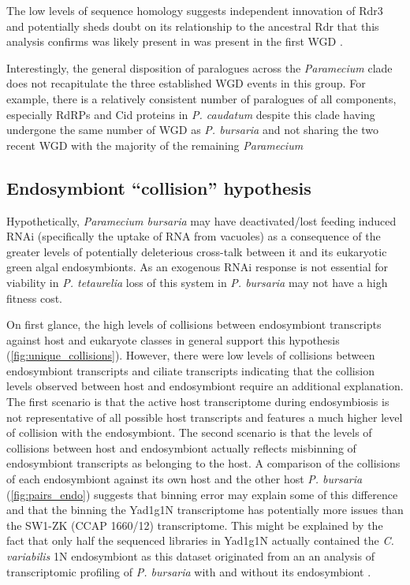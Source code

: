 The low levels of sequence homology suggests independent innovation 
of Rdr3 and potentially sheds doubt on its relationship to the ancestral
Rdr that this analysis confirms was likely present in 
was present in the first WGD \citep{Marker2014}.


Interestingly, the general disposition of paralogues across the \textit{Paramecium}
clade does not recapitulate the three established WGD events in this group.
For example, there is a relatively consistent number of paralogues of 
all components, especially RdRPs and Cid proteins in \textit{P. caudatum} 
despite this clade having undergone the same number of WGD as \textit{P. bursaria}
and not sharing the two recent WGD with the majority of the remaining \textit{Paramecium} 


\subsection{Endosymbiont ``collision'' hypothesis}

Hypothetically, \textit{Paramecium bursaria}
may have deactivated/lost feeding induced RNAi (specifically the
uptake of RNA from vacuoles) as a consequence
of the greater levels of potentially deleterious cross-talk between
it and its eukaryotic green algal endosymbionts.  
As an exogenous RNAi response is not essential 
for viability in \textit{P. tetaurelia} \citep{Marker2014} loss
of this system in \textit{P. bursaria} may not have a high fitness cost.


On first glance, the high levels of collisions between endosymbiont
transcripts against host and eukaryote classes in general support this
hypothesis (\cref{fig:unique_collisions}).
However, there were low levels of collisions between endosymbiont transcripts
and ciliate transcripts indicating that the collision levels
observed between host and endosymbiont require an additional explanation.
The first scenario is that the active host transcriptome during
endosymbiosis is not representative of all possible host transcripts
and features a much higher level of collision with the endosymbiont.
The second scenario is that the levels of collisions between host and
endosymbiont actually reflects misbinning of endosymbiont transcripts
as belonging to the host.  A comparison of the collisions
of each endosymbiont against its own host and the other host \textit{P. bursaria}
(\cref{fig:pairs_endo}) suggests that binning error may explain
some of this difference and that the binning the Yad1g1N transcriptome
has potentially more issues than the SW1-ZK (CCAP 1660/12) transcriptome.
This might be explained by the fact that only half the sequenced
libraries in Yad1g1N actually contained the \textit{C. variabilis} 1N endosymbiont
as this dataset originated from an an analysis of transcriptomic
profiling of \textit{P. bursaria} with and without its endosymbiont \citep{Kodama2014}.


